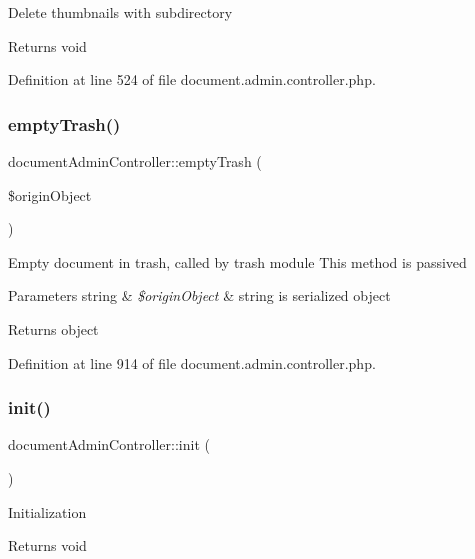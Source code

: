 Delete thumbnails with subdirectory \begin{DoxyReturn}{Returns}
void 
\end{DoxyReturn}


Definition at line 524 of file document.\+admin.\+controller.\+php.

\mbox{\label{classdocumentAdminController_a52981a3af3d6b94661444f65568343ca}} 
\subsubsection{\texorpdfstring{empty\+Trash()}{emptyTrash()}}
{\footnotesize\ttfamily document\+Admin\+Controller\+::empty\+Trash (\begin{DoxyParamCaption}\item[{}]{\$origin\+Object }\end{DoxyParamCaption})}

Empty document in trash, called by trash module This method is passived 
\begin{DoxyParams}[1]{Parameters}
string & {\em \$origin\+Object} & string is serialized object \\
\hline
\end{DoxyParams}
\begin{DoxyReturn}{Returns}
object 
\end{DoxyReturn}


Definition at line 914 of file document.\+admin.\+controller.\+php.

\mbox{\label{classdocumentAdminController_a14485f8ce213e059c30b41e6add269f9}} 
\subsubsection{\texorpdfstring{init()}{init()}}
{\footnotesize\ttfamily document\+Admin\+Controller\+::init (\begin{DoxyParamCaption}{ }\end{DoxyParamCaption})}

Initialization \begin{DoxyReturn}{Returns}
void 
\end{DoxyReturn}


